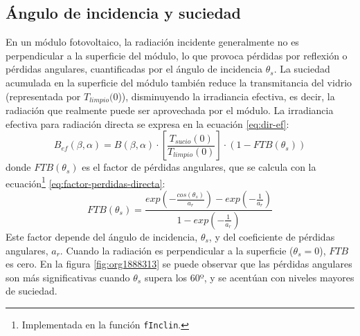\subsection{Ángulo de incidencia y suciedad}
\label{sec:org468f36a}
\label{subsec-angulo-incidencia-suciedad}
En un módulo fotovoltaico, la radiación incidente generalmente no es perpendicular a la superficie del módulo, lo que provoca pérdidas por reflexión o pérdidas angulares, cuantificadas por el ángulo de incidencia \(\theta_s\). La suciedad acumulada en la superficie del módulo también reduce la transmitancia del vidrio (representada por \(T_{limpio}(0\))), disminuyendo la irradiancia efectiva, es decir, la radiación que realmente puede ser aprovechada por el módulo.
La irradiancia efectiva para radiación directa se expresa en la ecuación \ref{eq:dir-ef}:
\begin{equation}
B_{ef}(\beta ,\alpha)=B(\beta ,\alpha)\cdot [\frac{T_{sucio}(0)}{T_{limpio}(0)}]\cdot (1-FTB(\theta_s))
\label{eq:dir-ef}
\end{equation}
donde \(FTB(\theta_s)\) es el factor de pérdidas angulares, que se calcula con la ecuación\footnote{Implementada en la función \texttt{fInclin}.} \ref{eq:factor-perdidas-directa}: 
\begin{equation}
FTB(\theta_s)=\frac{exp(-\frac{cos(\theta_s)}{a_r})-exp(-\frac{1}{a_r})}{1-exp(-\frac{1}{a_r})}
\label{eq:factor-perdidas-directa}
\end{equation}
Este factor depende del ángulo de incidencia, \(\theta_s\), y del coeficiente de pérdidas angulares, \(a_r\). Cuando la radiación es perpendicular a la superficie (\(\theta_s=0\)), \(FTB\) es cero. En la figura \ref{fig:org1888313} se puede observar que las pérdidas angulares son más significativas cuando \(\theta_s\) supera los 60º, y se acentúan con niveles mayores de suciedad.
